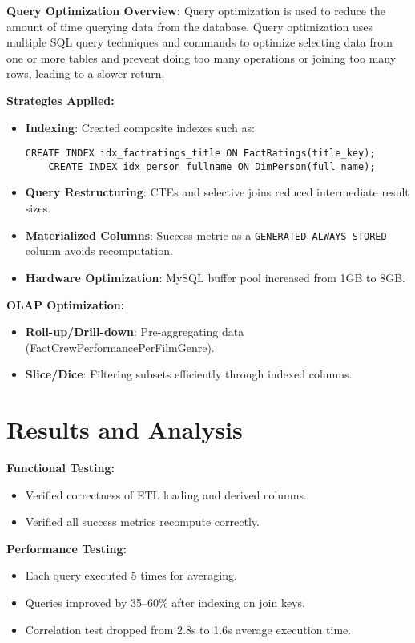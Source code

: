 \documentclass[sigconf, pbalance]{acmart}
\begin{document}
\textbf{Query Optimization Overview:}  
Query optimization is used to reduce the amount of time querying data from the database. Query optimization uses multiple SQL query techniques and commands to optimize selecting data from one or more tables and prevent doing too many operations or joining too many rows, leading to a slower return. 

\textbf{Strategies Applied:}
\begin{itemize}
    \item \textbf{Indexing}: Created composite indexes such as:
    \begin{lstlisting}[style=SQLStyle]
    CREATE INDEX idx_factratings_title ON FactRatings(title_key);
    CREATE INDEX idx_person_fullname ON DimPerson(full_name);
    \end{lstlisting}
    \item \textbf{Query Restructuring}: CTEs and selective joins reduced intermediate result sizes.
    \item \textbf{Materialized Columns}: Success metric as a \texttt{GENERATED ALWAYS STORED} column avoids recomputation.
    \item \textbf{Hardware Optimization}: MySQL buffer pool increased from 1GB to 8GB.
\end{itemize}

\textbf{OLAP Optimization:}
\begin{itemize}
    \item \textbf{Roll-up/Drill-down}: Pre-aggregating data (FactCrewPerformancePerFilmGenre).
    \item \textbf{Slice/Dice}: Filtering subsets efficiently through indexed columns.
\end{itemize}

\section{Results and Analysis}

\textbf{Functional Testing:}
\begin{itemize}
    \item Verified correctness of ETL loading and derived columns.
    \item Verified all success metrics recompute correctly.
\end{itemize}

\textbf{Performance Testing:}
\begin{itemize}
    \item Each query executed 5 times for averaging.
    \item Queries improved by 35--60\% after indexing on join keys.
    \item Correlation test dropped from 2.8s to 1.6s average execution time.
\end{itemize}
\end{document}
